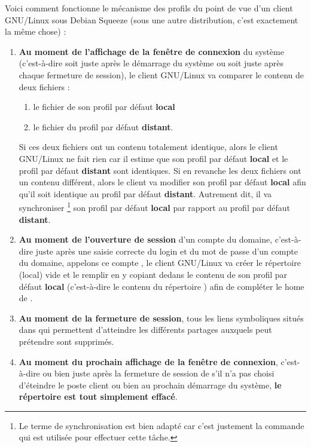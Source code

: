 Voici comment fonctionne le mécanisme des profils du point de vue d'un client GNU/Linux 
sous Debian Squeeze (sous une autre distribution, c'est exactement la
même chose) :
\begin{enumerate}
\item \textbf{Au moment de l'affichage de la fenêtre de connexion} du système
(c'est-à-dire soit juste après le démarrage
du système ou soit juste après chaque fermeture de session),
le client GNU/Linux va comparer le contenu de deux fichiers :
%
\begin{enumerate}
\item le fichier  de son profil par défaut \textbf{local}
\item le fichier  du profil par défaut \textbf{distant}.
\end{enumerate}
%
Si ces deux fichiers ont un contenu totalement identique,
alors le client GNU/Linux ne fait rien car il estime
que son profil par défaut \textbf{local} et le profil par défaut \textbf{distant} 
sont identiques. Si en revanche les deux fichiers ont un contenu différent,
alors le client va modifier son profil par défaut \textbf{local}
afin qu'il soit identique au profil par défaut \textbf{distant}.
Autrement dit, il va synchroniser%
\footnote{Le terme de synchronisation est bien adapté car c'est
justement la commande  qui est utilisée pour
effectuer cette tâche.}
son profil par défaut \textbf{local} par rapport au
profil par défaut \textbf{distant}.

\item \textbf{Au moment de l'ouverture de session} d'un compte du domaine,
c'est-à-dire juste après une saisie correcte du login et du mot de passe d'un
compte du domaine, appelons ce compte , le client GNU/Linux va créer
le répertoire (local) vide  et le remplir 
en y copiant dedans le contenu de son
profil par défaut \textbf{local} (c'est-à-dire le contenu du répertoire )
afin de compléter le home de .

\item \textbf{Au moment de la fermeture de session}, tous les liens
symboliques situés dans  qui permettent d'atteindre
les différents partages auxquels  peut prétendre sont
supprimés.

\item \textbf{Au moment du prochain affichage de la fenêtre
de connexion}, c'est-à-dire ou bien juste après la fermeture de session de
 s'il n'a pas
choisi d'éteindre le poste client ou bien au prochain démarrage du système, 
\textbf{le répertoire  est tout simplement effacé}.
\end{enumerate}



